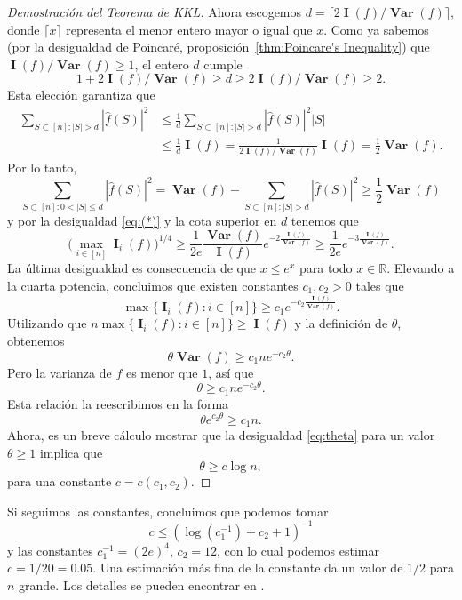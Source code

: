 \documentclass[autocontact]{gaceta}
\newcommand{\R}{\mathbb{R}}
\DeclareMathOperator{\Var}{\mathbf{Var}}
\DeclareMathOperator{\II}{\mathbf{I}}
\begin{document}
\begin{proof}[Demostración del Teorema de KKL]
Ahora escogemos $d=\lceil 2 \II(f)/\Var(f) \rceil$, donde $\lceil x \rceil$ representa el menor entero mayor o igual que $x$. Como ya sabemos (por la desigualdad de Poincaré, proposición~\ref{thm:Poincare's Inequality}) que $\II(f)/\Var(f)\geq 1$, el entero $d$ cumple
\[
1 + 2 \II(f)/\Var(f) \geq d \geq 2 \II(f)/\Var(f) \geq 2.
\]
Esta elección garantiza que
\begin{align*}
   \sum_{S\subset [n] \colon |S|> d} |\widehat{f}(S)|^2
   &\leq \frac{1}{d} \sum_{S\subset [n] \colon |S|>d} |\widehat{f}(S)|^2 |S|
   \\
   &\leq \frac{1}{d} \II(f) = \frac{1}{2 \II(f)/\Var(f)} \II(f)
   = \frac{1}{2} \Var(f).
\end{align*}
Por lo tanto,
\[
   \sum_{S\subset [n] \colon 0<|S|\leq d} |\widehat{f}(S)|^2
   = \Var(f)- \sum_{S\subset [n] \colon |S|> d}|\widehat{f}(S)|^2
   \geq \frac{1}{2} \Var(f)
\]
y por la desigualdad \eqref{eq:(*)} y la cota superior en $d$ tenemos que
\[
   \big(\max_{i\in [n]}\II_i(f)\big)^{1/4}
   \geq \frac{1}{2e} \frac{\Var(f)}{\II(f)} e^{-2\frac{\II(f)}{\Var(f)}}
   \geq \frac{1}{2e} e^{-3\frac{\II(f)}{\Var(f)}}.
\]
La última desigualdad es consecuencia de que $x\leq e^x$ para todo $x\in \R$. Elevando a la cuarta potencia, concluimos que existen constantes $c_1,c_2>0$ tales que
\begin{equation}\label{eq:max_Ii}
\max\{\II_i(f): i\in[n]\} \geq c_1e^{-c_2\frac{\II(f)}{\Var(f)}}.
\end{equation}
Utilizando que $n \max\{\II_i(f): i\in[n]\} \geq \II(f)$ y la definición de $\theta$, obtenemos
\[
\theta \Var(f) \geq c_1 n e^{-c_2 \theta}.
\]
Pero la varianza de $f$ es menor que $1$, así que
\[
\theta \geq c_1 n e^{-c_2 \theta}.
\]
Esta relación la reescribimos en la forma
\begin{equation}\label{eq:theta}
\theta e^{c_2 \theta} \geq c_1 n .
\end{equation}
Ahora, es un breve cálculo mostrar que la desigualdad \eqref{eq:theta} para un valor $\theta \geq 1$ implica que
\[
\theta \geq c \log n,
\]
para una constante $c = c (c_1, c_2)$.
\end{proof}

Si seguimos las constantes, concluimos que podemos tomar
\[
   c \leq (\log(c_1^{-1})+c_2+1)^{-1}
\]
y las constantes $c_1^{-1}=(2e)^{4}$, $c_2=12$, con lo cual podemos estimar $c=1/20= 0.05$. Una estimación más fina de la constante da un valor de $1/2$ para $n$ grande. Los detalles se pueden encontrar en \cite[ejercicio 9.30]{O'Do21}.
\end{document}
